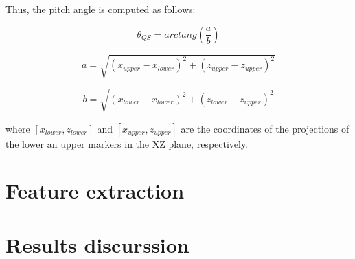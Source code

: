 Thus, the pitch angle is computed as follows:

\begin{equation}
\label{angleQS1}
	\theta_{QS}= arctang(\frac{a}{b})
\end{equation}

\begin{equation}
\label{angleQS2}
	a= \sqrt{(x_{upper}-x_{lower})^{2} + (z_{upper}-z_{upper})^{2} }
\end{equation}

\begin{equation}
\label{angleQS3}
	b= \sqrt{(x_{lower}-x_{lower})^{2} + (z_{lower}-z_{upper})^{2} }
\end{equation}

where $ [x_{lower}, z_{lower} ] $ and $ [x_{upper}, z_{upper} ] $ are the coordinates of the projections of the lower an upper markers in the XZ plane, respectively.

\section{Feature extraction}

\section{Results discurssion}

